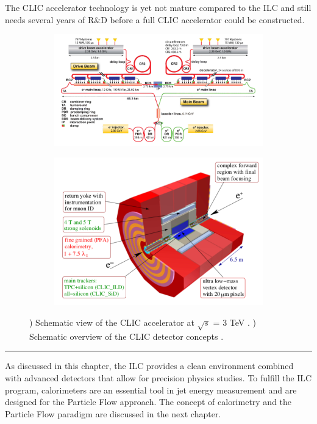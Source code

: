 The CLIC accelerator technology is yet not mature compared to the ILC and still needs several years of R\&D before a full CLIC accelerator could be constructed.

\begin{figure}[htbp!]
  \centering
  \begin{subfigure}{0.55\textwidth}
    \includegraphics[width=1\linewidth]{chap2/fig/CLIC_Machine.png}
    \caption{} \label{fig:CLICMachine}
  \end{subfigure}
  \hfill
  \begin{subfigure}{0.44\textwidth}
    \includegraphics[width=1\linewidth]{chap2/fig/CLIC_DetConcept.png}
    \caption{} \label{fig:CLICDet}
  \end{subfigure}
  \caption{) Schematic view of the CLIC accelerator at $\sqrt{s}$ = 3 TeV \cite{Aicheler:2012bya}. ) Schematic overview of the CLIC detector concepts \cite{CLIC:2016zwp}.} \label{fig:CLIC}
\end{figure}

\begin{center}
  \rule{0.5\textwidth}{.4pt}
\end{center}

As discussed in this chapter, the ILC provides a clean environment combined with advanced detectors that allow for precision physics studies. To fulfill the ILC program, calorimeters are an essential tool in jet energy measurement and are designed for the Particle Flow approach. The concept of calorimetry and the Particle Flow paradigm are discussed in the next chapter.

